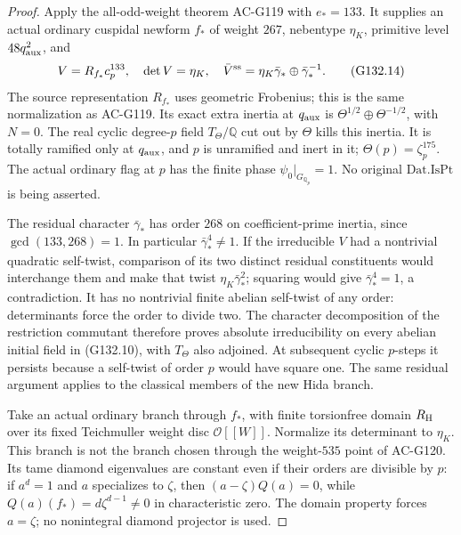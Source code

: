 \begin{proof}
Apply the all-odd-weight theorem AC-G119 with \(e_*=133\).
It supplies an actual ordinary cuspidal newform \(f_*\) of weight
\(267\), nebentype \(\eta_K\), primitive level
\(48q_{\rm aux}^2\), and
\[
 V=R_{f_*}c_p^{133},\quad \det V=\eta_K,\quad
 \bar V^{\rm ss}=\eta_K\bar\gamma_*\oplus\bar\gamma_*^{-1}.
 \tag{G132.14}
\]
The source representation \(R_{f_*}\) uses geometric Frobenius;
this is the same normalization as AC-G119.  Its exact extra
inertia at \(q_{\rm aux}\) is
\(\Theta^{1/2}\oplus\Theta^{-1/2}\), with \(N=0\).
The real cyclic degree-\(p\) field \(T_\Theta/\mathbb Q\)
cut out by \(\Theta\) kills this inertia.  It is totally
ramified only at \(q_{\rm aux}\), and \(p\) is unramified and
inert in it; \(\Theta(p)=\zeta_p^{175}\).
The actual ordinary flag at \(p\) has the finite phase
\(\psi_0|_{G_{\mathbb Q_p}}=1\).
No original \(\mathrm{Dat.IsPt}\) is being asserted.

The residual character \(\bar\gamma_*\) has order \(268\) on
coefficient-prime inertia, since \(\gcd(133,268)=1\).
In particular \(\bar\gamma_*^4\ne1\).
If the irreducible \(V\) had a nontrivial quadratic self-twist,
comparison of its two distinct residual constituents would
interchange them and make that twist \(\eta_K\bar\gamma_*^2\);
squaring would give \(\bar\gamma_*^4=1\), a contradiction.
It has no nontrivial finite abelian self-twist of any order:
determinants force the order to divide two.
The character decomposition of the restriction commutant
therefore proves absolute irreducibility on every abelian
initial field in (G132.10), with \(T_\Theta\) also adjoined.
At subsequent cyclic \(p\)-steps it persists because a
self-twist of order \(p\) would have square one.
The same residual argument applies to the classical members
of the new Hida branch.

Take an actual ordinary branch through \(f_*\), with finite
torsionfree domain \(R_{\rm H}\) over its fixed Teichmuller
weight disc \(\mathcal O[[W]]\).  Normalize its determinant to
\(\eta_K\).  This branch is not the branch chosen through the
weight-\(535\) point of AC-G120.
Its tame diamond eigenvalues are constant even if their orders
are divisible by \(p\): if \(a^d=1\) and \(a\) specializes to
\(\zeta\), then
\((a-\zeta)Q(a)=0\), while
\(Q(a)(f_*)=d\zeta^{d-1}\ne0\) in characteristic zero.
The domain property forces \(a=\zeta\); no nonintegral
diamond projector is used.


\end{proof}
